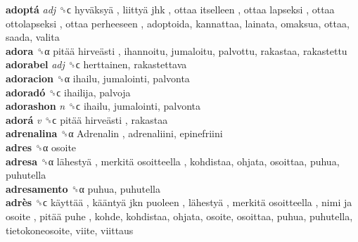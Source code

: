 \textbf{adoptá} \emph{adj}  ␝ϲ   hyväksyä ,  liittyä jhk ,  ottaa itselleen ,  ottaa lapseksi ,  ottaa ottolapseksi ,  ottaa perheeseen , adoptoida, kannattaa, lainata, omaksua, ottaa, saada, valita  \\
\textbf{adora} ␝α   pitää hirveästi , ihannoitu, jumaloitu, palvottu, rakastaa, rakastettu  \\
\textbf{adorabel} \emph{adj}  ␝ϲ  herttainen, rakastettava  \\
\textbf{adoracion} ␝α  ihailu, jumalointi, palvonta  \\
\textbf{adoradó} ␝ϲ  ihailija, palvoja  \\
\textbf{adorashon} \emph{n}  ␝ϲ  ihailu, jumalointi, palvonta  \\
\textbf{adorá} \emph{v}  ␝ϲ   pitää hirveästi , rakastaa  \\
\textbf{adrenalina} ␝α   Adrenalin , adrenaliini, epinefriini  \\
\textbf{adres} ␝α  osoite  \\
\textbf{adresa} ␝α   lähestyä ,  merkitä osoitteella , kohdistaa, ohjata, osoittaa, puhua, puhutella  \\
\textbf{adresamento} ␝α  puhua, puhutella  \\
\textbf{adrès} ␝ϲ   käyttää ,  kääntyä jkn puoleen ,  lähestyä ,  merkitä osoitteella ,  nimi ja osoite ,  pitää puhe , kohde, kohdistaa, ohjata, osoite, osoittaa, puhua, puhutella, tietokoneosoite, viite, viittaus  \\
